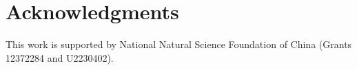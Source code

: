 
\section*{Acknowledgments}

This work is supported by National Natural Science Foundation of China (Grants 12372284 and U2230402).